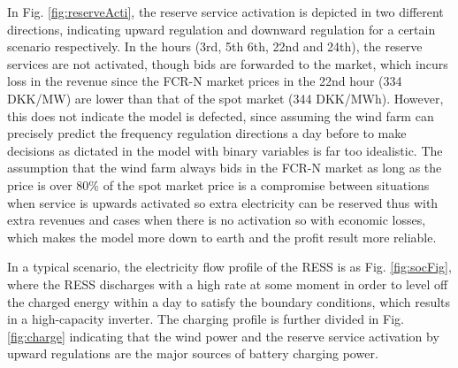 \documentclass[final,5p,times,twocolumn,authoryear]{elsarticle}
\begin{document}
In Fig. \ref{fig:reserveActi}, the reserve service activation is depicted in two different directions, indicating upward regulation and downward regulation for a certain scenario respectively. In the hours (3rd, 5th 6th, 22nd and 24th), the reserve services are not activated, though bids are forwarded to the market, which incurs loss in the revenue since the FCR-N market prices in the 22nd hour (334 DKK/MW) are lower than that of the spot market (344 DKK/MWh). However, this does not indicate the model is defected, since assuming the wind farm can precisely predict the frequency regulation directions a day before to make decisions as dictated in the model with binary variables is far too idealistic. The assumption that the wind farm always bids in the FCR-N market as long as the price is over 80\% of the spot market price is a compromise between situations when service is upwards activated so extra electricity can be reserved thus with extra revenues and cases when there is no activation so with economic losses, which makes the model more down to earth and the profit result more reliable.

In a typical scenario, the electricity flow profile of the RESS is as Fig. \ref{fig:socFig}, where the RESS discharges with a high rate at some moment in order to level off the charged energy within a day to satisfy the boundary conditions, which results in a high-capacity inverter. The charging profile is further divided in Fig. \ref{fig:charge} indicating that the wind power and the reserve service activation by upward regulations are the major sources of battery charging power.
\end{document}
